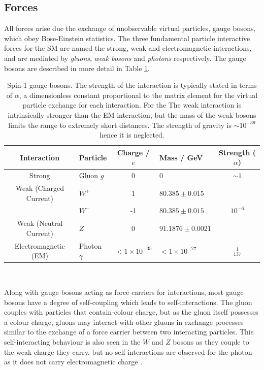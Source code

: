 	\subsection{Forces}

		All forces arise due the exchange of unobservable virtual particles, gauge bosons, which obey Bose-Einstein statistics. The three fundamental particle interactive forces for the SM are named the strong, weak and electromagnetic interactions, and are mediated by \textit{gluons}, \textit{weak bosons} and \textit{photons} respectively. The gauge bosons are described in more detail in Table \ref{t:tab:boson}.

		\begin{table}[ht]
			\caption[Properties of Spin-$1$ gauge bosons]{Spin-1 gauge bosons. The strength of the interaction is typically stated in terms of $\alpha$, a dimensionless constant proportional to the matrix element for the virtual particle exchange for each interaction. For the  The weak interaction is intrinsically stronger than the EM interaction, but the mass of the weak bosons limits the range to extremely short distances.  The strength of gravity is $\sim10^{-39}$ hence it is neglected. \cite{pdg}}
			\label{t:tab:boson}
			\medskip
			\centering
			\begin{tabular}{clclc}\toprule
				Interaction & Particle & Charge / $e$ & Mass / GeV & Strength ($\alpha$) \\\midrule
				Strong    &     Gluon $g$      & 0 & 0 & $\sim1$\\
				Weak (Charged Current)&     $W^+$    &    1   & $80.385\pm0.015$ & \\
				&     $W^-$    &    -1   & $80.385\pm0.015$ & $10^{-6}$ \\
				Weak (Neutral Current)&     $Z$   &    0   & $91.1876\pm0.0021$ & \\
				Electromagnetic (EM)   &     Photon $\gamma$  &  $<1\times10^{-35}$   & $<1\times10^{-27}$ & $\frac{1}{137}$\\\bottomrule
			\end{tabular}\\[5pt]
		\end{table}

		Along with gauge bosons acting as force carriers for interactions, most gauge bosons have a degree of self-coupling which leads to self-interactions. The gluon couples with particles that contain-colour charge, but as the gluon itself possesses a colour charge, gluons may interact with other gluons in exchange processes similar to the exchange of a force carrier between two interacting particles. This self-interacting behaviour is also seen in the $W$ and $Z$ bosons as they couple to the weak charge they carry, but no self-interactions are observed for the photon as it does not carry electromagnetic charge \cite{martinshaw}.

